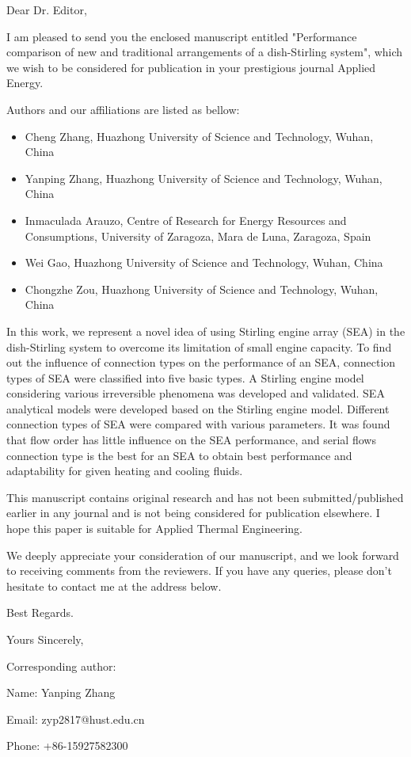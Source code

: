 \documentclass[12pt]{letter}
\begin{document}
Dear Dr. Editor,

I am pleased to send you the enclosed manuscript entitled "Performance comparison of new and traditional arrangements of a dish-Stirling system", which we wish to be considered for publication in your prestigious journal Applied Energy.

Authors and our affiliations are listed as bellow:

\begin{itemize}
  \item Cheng Zhang, Huazhong University of Science and Technology, Wuhan, China

  \item Yanping Zhang, Huazhong University of Science and Technology, Wuhan, China
  
  \item Inmaculada Arauzo, Centre of Research for Energy Resources and Consumptions, University of Zaragoza, Mara de Luna, Zaragoza, Spain
  
  \item Wei Gao, Huazhong University of Science and Technology, Wuhan, China
  
  \item Chongzhe Zou, Huazhong University of Science and Technology, Wuhan, China

\end{itemize}

In this work, we represent a novel idea of using Stirling engine array (SEA) in the dish-Stirling system to overcome its limitation of small engine capacity. To find out the influence of connection types on the performance of an SEA, connection types of SEA were classified into five basic types. A Stirling engine model considering various irreversible phenomena was developed and validated. SEA analytical models were developed based on the Stirling engine model. Different connection types of SEA were compared with various parameters. It was found that flow order has little influence on the SEA performance, and serial flows connection type is the best for an SEA to obtain best performance and adaptability for given heating and cooling fluids.

This manuscript contains original research and has not been submitted/published earlier in any journal and is not being considered for publication elsewhere. I hope this paper is suitable for Applied Thermal Engineering.

We deeply appreciate your consideration of our manuscript, and we look forward to receiving comments from the reviewers. If you have any queries, please don't hesitate to contact me at the address below.

Best Regards.

Yours Sincerely,

Corresponding author:

Name: Yanping Zhang

Email: zyp2817@hust.edu.cn

Phone: +86-15927582300
\end{document}
